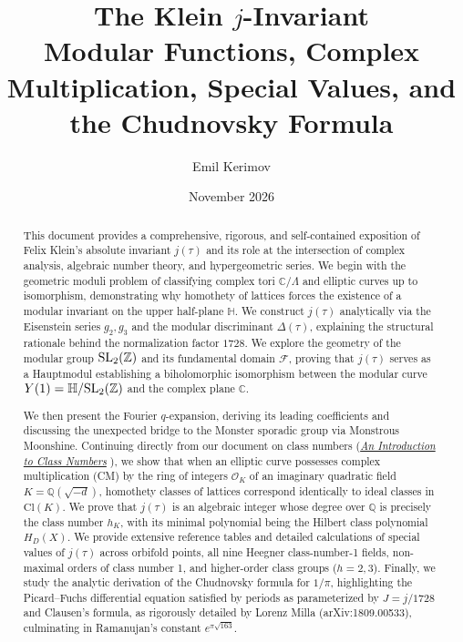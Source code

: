 \documentclass[a4paper]{article}
\title{\textbf{The Klein $j$-Invariant}\\[4pt]\large Modular Functions, Complex Multiplication, Special Values, and the Chudnovsky Formula}
\author{Emil Kerimov}
\date{November 2026}
\begin{document}
\maketitle

\begin{abstract}
This document provides a comprehensive, rigorous, and self-contained exposition of Felix Klein's absolute invariant $j(\tau)$ and its role at the intersection of complex analysis, algebraic number theory, and hypergeometric series. We begin with the geometric moduli problem of classifying complex tori $\mathbb{C}/\Lambda$ and elliptic curves up to isomorphism, demonstrating why homothety of lattices forces the existence of a modular invariant on the upper half-plane $\mathbb{H}$. We construct $j(\tau)$ analytically via the Eisenstein series $g_2, g_3$ and the modular discriminant $\Delta(\tau)$, explaining the structural rationale behind the normalization factor $1728$. We explore the geometry of the modular group $\mathrm{SL}_2(\mathbb{Z})$ and its fundamental domain $\mathcal{F}$, proving that $j(\tau)$ serves as a Hauptmodul establishing a biholomorphic isomorphism between the modular curve $Y(1) = \mathbb{H}/\mathrm{SL}_2(\mathbb{Z})$ and the complex plane $\mathbb{C}$. 

We then present the Fourier $q$-expansion, deriving its leading coefficients and discussing the unexpected bridge to the Monster sporadic group via Monstrous Moonshine. Continuing directly from our document on class numbers (\href{class_numbers_main.pdf}{\emph{An Introduction to Class Numbers}} \cite{kerimov2026class}), we show that when an elliptic curve possesses complex multiplication (CM) by the ring of integers $\mathcal{O}_K$ of an imaginary quadratic field $K = \mathbb{Q}(\sqrt{-d})$, homothety classes of lattices correspond identically to ideal classes in $\mathrm{Cl}(K)$. We prove that $j(\tau)$ is an algebraic integer whose degree over $\mathbb{Q}$ is precisely the class number $h_K$, with its minimal polynomial being the Hilbert class polynomial $H_D(X)$. We provide extensive reference tables and detailed calculations of special values of $j(\tau)$ across orbifold points, all nine Heegner class-number-1 fields, non-maximal orders of class number 1, and higher-order class groups ($h=2, 3$). Finally, we study the analytic derivation of the Chudnovsky formula for $1/\pi$, highlighting the Picard--Fuchs differential equation satisfied by periods as parameterized by $J = j/1728$ and Clausen's formula, as rigorously detailed by Lorenz Milla (arXiv:1809.00533), culminating in Ramanujan's constant $e^{\pi\sqrt{163}}$.
\end{abstract}
\end{document}
